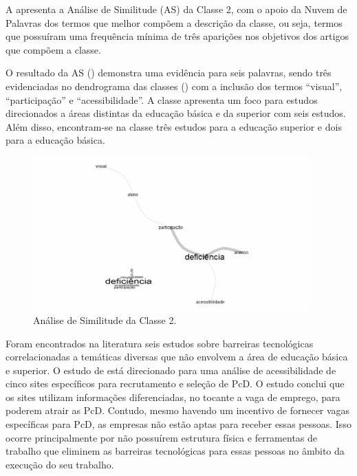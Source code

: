 \documentclass{textolivre}
\begin{document}
A  apresenta a Análise de Similitude (AS) da Classe 2, com o apoio da Nuvem de Palavras dos termos que melhor compõem a descrição da classe, ou seja, termos que possuíram uma frequência mínima de três aparições nos objetivos dos artigos que compõem a classe.

O resultado da AS () demonstra uma evidência para seis palavras, sendo três evidenciadas no dendrograma das classes () com a inclusão dos termos “visual”, “participação” e “acessibilidade”. A classe apresenta um foco para estudos direcionados a áreas distintas da educação básica e da superior com seis estudos. Além disso, encontram-se na classe três estudos para a educação superior e dois para a educação básica.

\begin{figure}[htbp]
 \centering
 \includegraphics[width=0.95\textwidth]{fig4-32563.png}
 \caption{Análise de Similitude da Classe 2.}
 \label{fig4}
\end{figure}

Foram encontrados na literatura seis estudos sobre barreiras tecnológicas correlacionadas a temáticas diversas \cite{amaral2012, cantoranietal2015, freire2009, lima2016, pagliuca2015, silva2015} que não envolvem a área de educação básica e superior. O estudo de \textcite{lima2016} está direcionado para uma análise de acessibilidade de cinco sites específicos para recrutamento e seleção de PcD. O estudo conclui que os sites utilizam informações diferenciadas, no tocante a vaga de emprego, para poderem atrair as PcD. Contudo, mesmo havendo um incentivo de fornecer vagas específicas para PcD, as empresas não estão aptas para receber essas pessoas. Isso ocorre principalmente por não possuírem estrutura física e ferramentas de trabalho que eliminem as barreiras tecnológicas para essas pessoas no âmbito da execução do seu trabalho.
\end{document}
